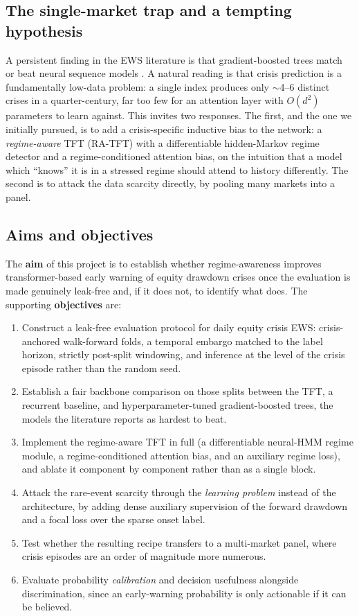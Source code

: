 \documentclass[11pt,a4paper]{article}
\begin{document}
\subsection{The single-market trap and a tempting hypothesis}
A persistent finding in the EWS literature is that gradient-boosted trees
match or beat neural sequence models
\citep{bluwstein2023credit,holopainen2017toward,beutel2019does}. A natural
reading is that crisis prediction is a fundamentally low-data problem: a
single index produces only $\sim$4--6 distinct crises in a quarter-century,
far too few for an attention layer with $O(d^2)$ parameters to learn against.
This invites two responses. The first, and the one we initially pursued,
is to add a crisis-specific inductive bias to the network: a
\emph{regime-aware} TFT (RA-TFT) with a differentiable hidden-Markov regime
detector and a regime-conditioned attention bias, on the intuition that a
model which ``knows'' it is in a stressed regime should attend to history
differently. The second is to attack the data scarcity directly, by pooling
many markets into a panel.

\subsection{Aims and objectives}
\label{sec:aims}
The \textbf{aim} of this project is to establish whether regime-awareness
improves transformer-based early warning of equity drawdown crises once the
evaluation is made genuinely leak-free and, if it does not, to identify what
does. The supporting \textbf{objectives} are:

\begin{enumerate}
\item Construct a leak-free evaluation protocol for daily equity crisis EWS:
crisis-anchored walk-forward folds, a temporal embargo matched to the label
horizon, strictly post-split windowing, and inference at the level of the
crisis episode rather than the random seed.
\item Establish a fair backbone comparison on those splits between the TFT, a
recurrent baseline, and hyperparameter-tuned gradient-boosted trees, the
models the literature reports as hardest to beat.
\item Implement the regime-aware TFT in full (a differentiable neural-HMM
regime module, a regime-conditioned attention bias, and an auxiliary regime
loss), and ablate it component by component rather than as a single block.
\item Attack the rare-event scarcity through the \emph{learning problem}
instead of the architecture, by adding dense auxiliary supervision of the
forward drawdown and a focal loss over the sparse onset label.
\item Test whether the resulting recipe transfers to a multi-market panel,
where crisis episodes are an order of magnitude more numerous.
\item Evaluate probability \emph{calibration} and decision usefulness
alongside discrimination, since an early-warning probability is only actionable
if it can be believed.
\end{enumerate}
\end{document}
